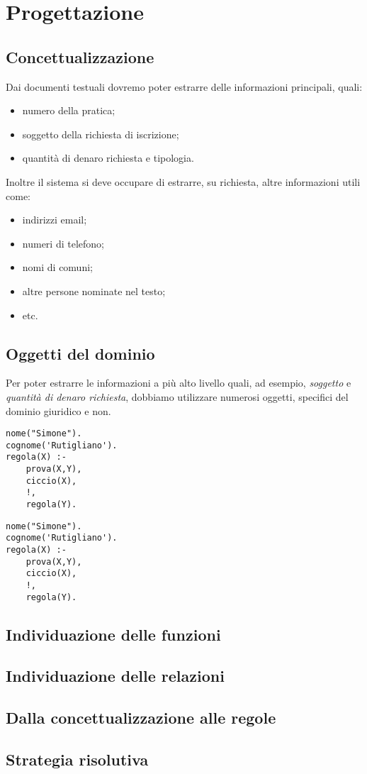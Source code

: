 \section{Progettazione}

\subsection{Concettualizzazione}
Dai documenti testuali dovremo poter estrarre delle informazioni principali, quali:
\begin{itemize}
\item numero della pratica; %
\item soggetto della richiesta di iscrizione;
\item quantità di denaro richiesta e tipologia.
\end{itemize}

Inoltre il sistema si deve occupare di estrarre, su richiesta, altre informazioni utili come:
\begin{itemize}
\item indirizzi email;
\item numeri di telefono;
\item nomi di comuni;
\item altre persone nominate nel testo;
\item etc.
\end{itemize}



\subsection{Oggetti del dominio}
Per poter estrarre le informazioni a più alto livello quali, ad esempio, \emph{soggetto} e \emph{quantità di denaro richiesta}, dobbiamo utilizzare numerosi oggetti, specifici del dominio giuridico e non.

\begin{verbatim}
nome("Simone").
cognome('Rutigliano').
regola(X) :- 
	prova(X,Y),
	ciccio(X),
	!,
	regola(Y).
\end{verbatim}

\begin{lstlisting}
nome("Simone").
cognome('Rutigliano').
regola(X) :- 
	prova(X,Y),
	ciccio(X),
	!,
	regola(Y).
\end{lstlisting}


\subsection{Individuazione delle funzioni}

\subsection{Individuazione delle relazioni}

\subsection{Dalla concettualizzazione alle regole}

\subsection{Strategia risolutiva}
